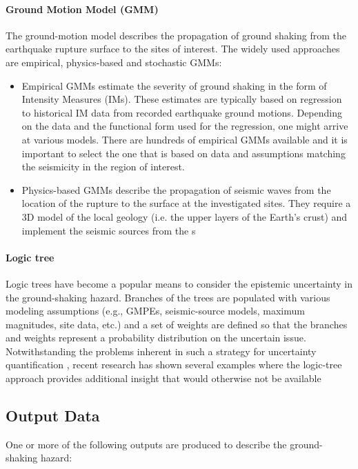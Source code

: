 \paragraph{Ground Motion Model (GMM)} The ground-motion model describes the propagation of ground shaking from the earthquake rupture surface to the sites of interest. The widely used approaches are empirical, physics-based and stochastic GMMs:
\begin{itemize}
    \item Empirical GMMs estimate the severity of ground shaking in the form of Intensity Measures (IMs). These estimates are typically based on regression to historical IM data from recorded earthquake ground motions. Depending on the data and the functional form used for the regression, one might arrive at various models. There are hundreds of empirical GMMs available \citep{douglas2018ground} and it is important to select the one that is based on data and assumptions matching the seismicity in the region of interest.
    \item Physics-based GMMs describe the propagation of seismic waves from the location of the rupture to the surface at the investigated sites. They require a 3D model of the local geology (i.e. the upper layers of the Earth's crust) and implement the seismic sources from the s
\end{itemize}


\paragraph{Logic tree} Logic trees have become a popular means to consider the epistemic uncertainty in the ground-shaking hazard. Branches of the trees are populated with various modeling assumptions (e.g., GMPEs, seismic-source models, maximum magnitudes, site data, etc.) and a set of weights are defined so that the branches and weights represent a probability distribution on the uncertain issue. Notwithstanding the problems inherent in such a strategy for uncertainty quantification \citep{bommer2008use}, recent research has shown several examples where the logic-tree approach provides additional insight that would otherwise not be available \citep[see e.g.,][]{goulet2017ngaeast}

\subsection{Output Data}

\noindent One or more of the following outputs are produced to describe the ground-shaking hazard:

